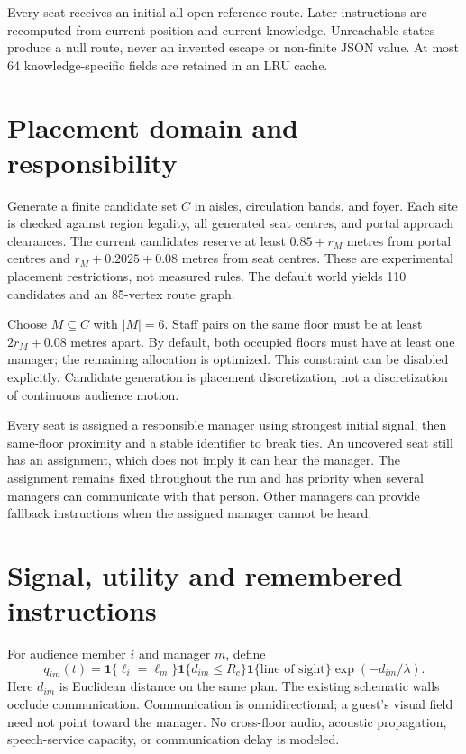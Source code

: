 \documentclass[11pt]{article}
\newcommand{\ind}{\mathbf{1}}
\begin{document}
Every seat receives an initial all-open reference route. Later instructions
are recomputed from current position and current knowledge. Unreachable states
produce a null route, never an invented escape or non-finite JSON value.
At most 64 knowledge-specific fields are retained in an LRU cache.

\section{Placement domain and responsibility}
Generate a finite candidate set $C$ in aisles, circulation bands, and foyer.
Each site is checked against region legality, all generated seat centres, and
portal approach clearances. The current candidates reserve at least
$0.85+r_M$ metres from portal centres and $r_M+0.2025+0.08$ metres from seat
centres. These are experimental placement restrictions, not measured rules.
The default world yields 110 candidates and an 85-vertex route graph.

Choose $M\subseteq C$ with $|M|=6$. Staff pairs on the same floor must be at
least $2r_M+0.08$ metres apart. By default, both occupied floors must have at
least one manager; the remaining allocation is optimized. This constraint can
be disabled explicitly. Candidate generation is placement discretization,
not a discretization of continuous audience motion.

Every seat is assigned a responsible manager using strongest initial signal,
then same-floor proximity and a stable identifier to break ties. An uncovered
seat still has an assignment, which does not imply it can hear the manager.
The assignment remains fixed throughout the run and has priority when several
managers can communicate with that person. Other managers can provide fallback
instructions when the assigned manager cannot be heard.

\section{Signal, utility and remembered instructions}
For audience member $i$ and manager $m$, define
\[
 q_{im}(t)=\ind\{\ell_i=\ell_m\}
 \ind\{d_{im}\leq R_c\}\ind\{\text{line of sight}\}
 \exp(-d_{im}/\lambda).
\]
Here $d_{im}$ is Euclidean distance on the same plan. The existing schematic
walls occlude communication. Communication is omnidirectional; a guest's
visual field need not point toward the manager. No cross-floor audio, acoustic
propagation, speech-service capacity, or communication delay is modeled.
\end{document}
